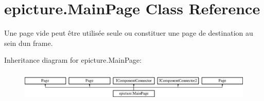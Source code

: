 \hypertarget{classepicture_1_1_main_page}{}\section{epicture.\+Main\+Page Class Reference}
\label{classepicture_1_1_main_page}


Une page vide peut être utilisée seule ou constituer une page de destination au sein d\textquotesingle{}un frame.  


Inheritance diagram for epicture.\+Main\+Page\+:\begin{figure}[H]
\begin{center}
\leavevmode
\includegraphics[height=1.473684cm]{classepicture_1_1_main_page}
\end{center}
\end{figure}
